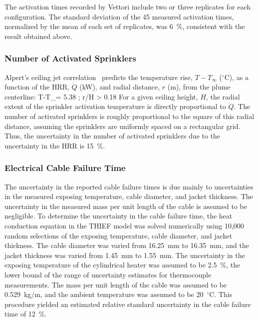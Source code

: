 The activation times recorded by Vettori include two or three replicates for each configuration. The standard deviation of the 45 measured activation times, normalized by the mean of each set of replicates, was 6~\%, consistent with the result obtained above.

\subsubsection{Number of Activated Sprinklers}

Alpert's ceiling jet correlation~\cite{SFPE:Alpert} predicts the temperature rise, $T-T_\infty$ ($^\circ$C), as a function of the HRR, $\dot{Q}$ (kW), and radial distance, $r$ (m), from the plume centerline:
\be
   T-T_\infty = 5.38 \;  \quad ; \quad r/H > 0.18
\ee
For a given ceiling height, $H$, the radial extent of the sprinkler activation temperature is directly proportional to $\dot{Q}$. The number of activated sprinklers is roughly proportional to the square of this radial distance, assuming the sprinklers are uniformly spaced on a rectangular grid. Thus, the uncertainty in the number of activated sprinklers due to the uncertainty in the HRR is 15~\%.


\subsubsection{Electrical Cable Failure Time}

The uncertainty in the reported cable failure times is due mainly to uncertainties in the measured exposing temperature, cable diameter, and jacket thickness. The uncertainty in the measured mass per unit length of the cable is assumed to be negligible. To determine the uncertainty in the cable failure time, the heat conduction equation in the THIEF model was solved numerically using 10,000 random selections of the exposing temperature, cable diameter, and jacket thickness. The cable diameter was varied from 16.25~mm to 16.35~mm, and the jacket thickness was varied from 1.45~mm to 1.55~mm. The uncertainty in the exposing temperature of the cylindrical heater was assumed to be 2.5~\%, the lower bound of the range of uncertainty estimates for thermocouple measurements. The mass per unit length of the cable was assumed to be 0.529~kg/m, and the ambient temperature was assumed to be 20~$^\circ$C. This procedure yielded an estimated relative standard uncertainty in the cable failure time of 12~\%.

